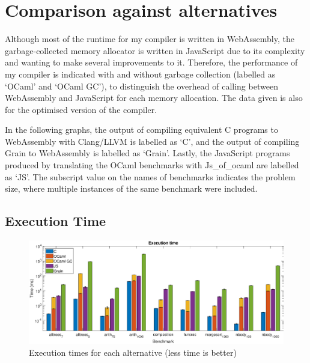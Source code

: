 

\section{Comparison against alternatives}
Although most of the runtime for my compiler is written in WebAssembly, the garbage-collected memory allocator is written in JavaScript due to its complexity and wanting to make several improvements to it. Therefore, the performance of my compiler is indicated with and without garbage collection (labelled as `OCaml' and `OCaml GC'), to distinguish the overhead of calling between WebAssembly and JavaScript for each memory allocation. The data given is also for the optimised version of the compiler.

In the following graphs, the output of compiling equivalent C programs to WebAssembly with Clang/LLVM is labelled as `C', and the output of compiling Grain to WebAssembly is labelled as `Grain'. Lastly, the JavaScript programs produced by translating the OCaml benchmarks with Js\_of\_ocaml are labelled as `JS'. The subscript value on the names of benchmarks indicates the problem size, where multiple instances of the same benchmark were included.

\subsection{Execution Time}

\begin{figure}[H]
\hspace{-0.7cm}
\includegraphics[scale=0.42]{figures/alternatives_timing}
\vspace{-0.5cm}
\caption{Execution times for each alternative (less time is better)}
 \label{fig:alt_timing} 
\end{figure}


